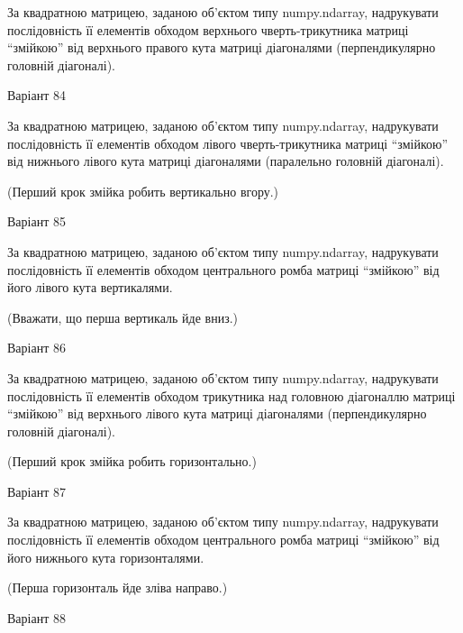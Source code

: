 \documentclass[11pt, ukrainian]{article}
\begin{document}
За квадратною матрицею, заданою об'єктом типу numpy.ndarray, надрукувати послідовність її елементів обходом верхнього чверть-трикутника матриці ``змійкою'' від верхнього правого кута матриці діагоналями (перпендикулярно головній діагоналі).





{\Large \center  Варіант  84\par \bigskip\bigskip}

За квадратною матрицею, заданою об'єктом типу numpy.ndarray, надрукувати послідовність її елементів обходом лівого чверть-трикутника матриці ``змійкою'' від нижнього лівого кута матриці діагоналями (паралельно головній діагоналі).


(Перший крок змійка робить вертикально вгору.)


{\Large \center  Варіант  85\par \bigskip\bigskip}

За квадратною матрицею, заданою об'єктом типу numpy.ndarray, надрукувати послідовність її елементів обходом центрального ромба матриці ``змійкою'' від його лівого кута вертикалями.

(Вважати, що перша вертикаль йде вниз.)



{\Large \center  Варіант  86\par \bigskip\bigskip}

За квадратною матрицею, заданою об'єктом типу numpy.ndarray, надрукувати послідовність її елементів обходом трикутника над головною діагоналлю матриці ``змійкою'' від верхнього лівого кута матриці діагоналями (перпендикулярно головній діагоналі).

(Перший крок змійка робить горизонтально.)



{\Large \center  Варіант  87\par \bigskip\bigskip}

За квадратною матрицею, заданою об'єктом типу numpy.ndarray, надрукувати послідовність її елементів обходом центрального ромба матриці ``змійкою'' від його нижнього кута горизонталями.

(Перша горизонталь йде зліва направо.)



{\Large \center  Варіант  88\par \bigskip\bigskip}
\end{document}
